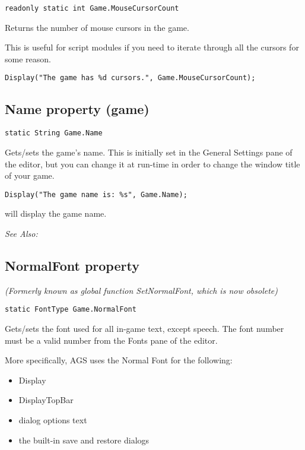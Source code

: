 \begin{verbatim}
readonly static int Game.MouseCursorCount
\end{verbatim}
Returns the number of mouse cursors in the game.

This is useful for script modules if you need to iterate through all the cursors for some reason.

\begin{verbatim}
Display("The game has %d cursors.", Game.MouseCursorCount);
\end{verbatim}


\subsection{Name property (game)}\label{Game.Name}%

\begin{verbatim}
static String Game.Name
\end{verbatim}
Gets/sets the game's name. This is initially set in the General Settings pane of the editor,
but you can change it at run-time in order to change the window title of your game.

\begin{verbatim}
Display("The game name is: %s", Game.Name);
\end{verbatim}
will display the game name.

\it{See Also:} 


\subsection{NormalFont property}\label{Game.NormalFont}%

\it{(Formerly known as global function SetNormalFont, which is now obsolete)}

\begin{verbatim}
static FontType Game.NormalFont
\end{verbatim}
Gets/sets the font used for all in-game text, except speech.
The font number must be a valid number from the Fonts pane of the editor.

More specifically, AGS uses the Normal Font for the following:
\begin{itemize}
\item Display
\item DisplayTopBar
\item dialog options text
\item the built-in save and restore dialogs
\end{itemize}

